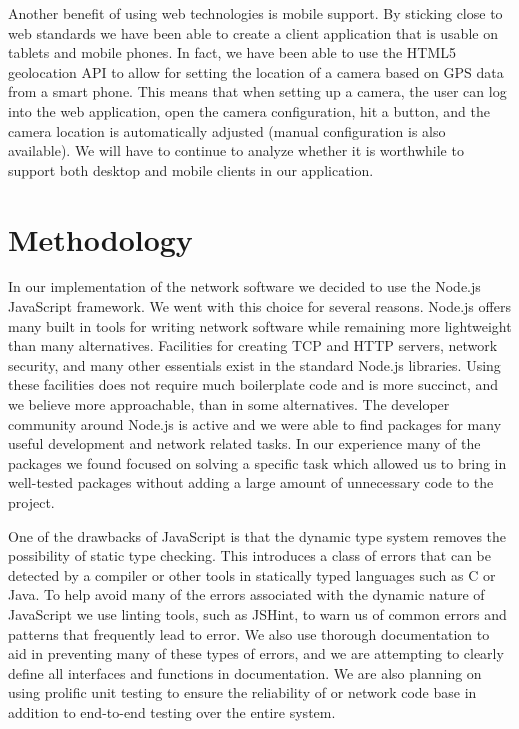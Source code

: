 Another benefit of using web technologies is mobile support. By sticking close
to web standards we have been able to create a client application that is usable
on tablets and mobile phones. In fact, we have been able to use the HTML5
geolocation API to allow for setting the location of a camera based on GPS data
from a smart phone. This means that when setting up a camera, the user can log
into the web application, open the camera configuration, hit a button, and the
camera location is automatically adjusted (manual configuration is also
available). We will have to continue to analyze whether it is worthwhile to
support both desktop and mobile clients in our application.


\section{Methodology}

In our implementation of the network software we decided to use the Node.js
JavaScript framework. We went with this choice for several reasons. Node.js
offers many built in tools for writing network software while remaining more
lightweight than many alternatives. Facilities for creating TCP and HTTP
servers, network security, and many other essentials exist in the standard
Node.js libraries. Using these facilities does not require much boilerplate code
and is more succinct, and we believe more approachable, than in some
alternatives. The developer community around Node.js is active and we were able
to find packages for many useful development and network related tasks. In our
experience many of the packages we found focused on solving a specific task
which allowed us to bring in well-tested packages without adding a large amount
of unnecessary code to the project.

One of the drawbacks of JavaScript is that the dynamic type system removes the
possibility of static type checking. This introduces a class of errors that can
be detected by a compiler or other tools in statically typed languages such as C
or Java. To help avoid many of the errors associated with the dynamic nature of
JavaScript we use linting tools, such as JSHint, to warn us of common errors and
patterns that frequently lead to error. We also use thorough documentation to
aid in preventing many of these types of errors, and we are attempting to clearly
define all interfaces and functions in documentation.  We are also planning on
using prolific unit testing to ensure the reliability of or network code base in
addition to end-to-end testing over the entire system.

